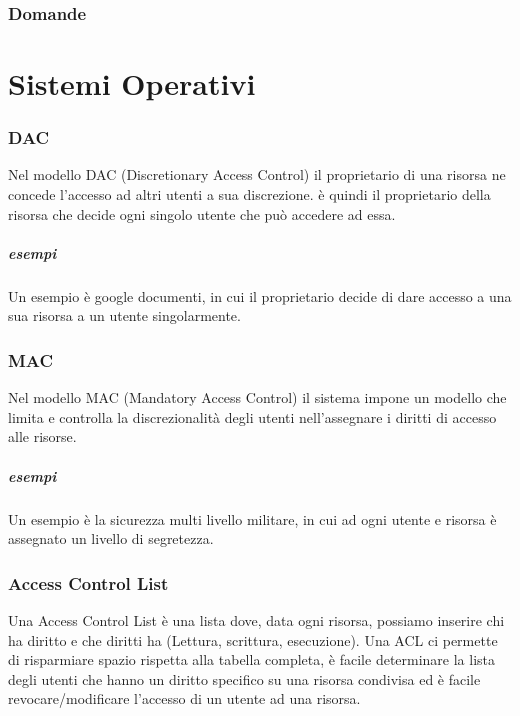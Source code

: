 \documentclass[12pt, a4paper, openany]{book}
\begin{document}
\subsection{Domande}


\chapter{Sistemi Operativi}
\subsection{DAC}
Nel modello DAC (Discretionary Access Control) il proprietario di una risorsa ne concede l'accesso ad altri utenti a sua discrezione. 
è quindi il proprietario della risorsa che decide ogni singolo utente che può accedere ad essa.
\paragraph*{esempi} Un esempio è google documenti, in cui il proprietario decide di dare accesso a una sua risorsa a un utente singolarmente.

\subsection{MAC} 
Nel modello MAC (Mandatory Access Control) il sistema impone un modello che limita e controlla la discrezionalità degli utenti nell'assegnare i diritti di accesso alle risorse.
\paragraph*{esempi} Un esempio è la sicurezza multi livello militare, in cui ad ogni utente e risorsa è assegnato un livello di segretezza.

\subsection{Access Control List}
Una Access Control List è una lista dove, data ogni risorsa, possiamo inserire chi ha diritto e che diritti ha (Lettura, scrittura, esecuzione).
Una ACL ci permette di risparmiare spazio rispetta alla tabella completa, è facile determinare la lista degli utenti che hanno un diritto specifico su una risorsa condivisa ed è facile revocare/modificare l'accesso di un utente ad una risorsa.
\end{document}
